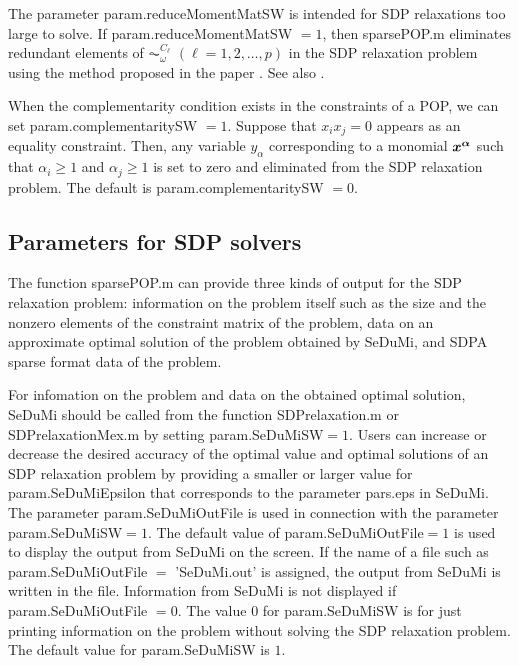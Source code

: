 The parameter
{\sf  param.reduceMomentMatSW} is intended for SDP relaxations too large to solve.
If {\sf  param.}{\sf reduceMomentMatSW} $=1$, then  sparsePOP.m
eliminates redundant elements
of $\AC_{\omega}^{C_{\ell}}$ $(\ell=1,2,\ldots,p)$
in the %
SDP relaxation problem
using the method proposed in the paper \cite{KOJ03a}.
See also \cite{WAKI04}.

When the complementarity condition exists
in the constraints of a POP, %
we can set {\sf param.}{\sf complementaritySW} $ = 1$.
Suppose that $x_i x_j = 0$ appears as an equality constraint.
Then, any variable $y_{\alpha}$
corresponding to a monomial $\x^{\salpha}$ such that $\alpha_i \geq 1$
and $\alpha_j \geq 1$ is set to zero and eliminated from the %
SDP relaxation problem.
The default is  {\sf param.complementaritySW} $ = 0$.

\subsection{Parameters for  SDP solvers}


The function sparsePOP.m can provide three kinds of output for the SDP
relaxation problem:
information on the problem itself such as
the size and the nonzero elements of the constraint matrix of the problem,
data on an approximate optimal solution of the problem obtained by SeDuMi,
and SDPA sparse format data of the problem.

For infomation on the problem and data on the obtained optimal solution,
SeDuMi should be called from the function
SDPrelaxation.m or SDPrelaxationMex.m
by setting {\sf param.SeDuMiSW}$=1$.
Users can increase or decrease the desired accuracy of the optimal value and
optimal solutions of an SDP relaxation problem by providing a smaller or larger
value for {\sf param.SeDuMiEpsilon} that corresponds to the parameter
 {\sf pars.eps} in SeDuMi.
The parameter {\sf param.SeDuMiOutFile} is used in connection with
the parameter {\sf param.SeDuMiSW}$=1$.
The default value of {\sf param.SeDuMiOutFile}$=1$ is used to display the output from SeDuMi
on the screen. If  the name of
a file such as {\sf param.SeDuMiOutFile} $=$ 'SeDuMi.out' is assigned,
the output from SeDuMi is written in the file. Information from SeDuMi is
not displayed if  {\sf param.SeDuMiOutFile} $=0$.
The value $0$ for {\sf param.SeDuMiSW} is for just printing  information
on the problem  without solving  the SDP relaxation problem.
The default value for  {\sf param.SeDuMiSW} is $1$.

